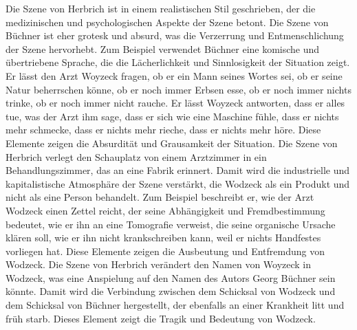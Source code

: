 \documentclass[a4paper,12pt]{report}
\begin{document}
Die Szene von Herbrich ist in einem realistischen Stil geschrieben, der die medizinischen und psychologischen Aspekte der Szene betont. Die Szene von Büchner ist eher grotesk und absurd, was die Verzerrung und Entmenschlichung der Szene hervorhebt. Zum Beispiel verwendet Büchner eine komische und übertriebene Sprache, die die Lächerlichkeit und Sinnlosigkeit der Situation zeigt. Er lässt den Arzt Woyzeck fragen, ob er ein Mann seines Wortes sei, ob er seine Natur beherrschen könne, ob er noch immer Erbsen esse, ob er noch immer nichts trinke, ob er noch immer nicht rauche. Er lässt Woyzeck antworten, dass er alles tue, was der Arzt ihm sage, dass er sich wie eine Maschine fühle, dass er nichts mehr schmecke, dass er nichts mehr rieche, dass er nichts mehr höre. Diese Elemente zeigen die Absurdität und Grausamkeit der Situation.
Die Szene von Herbrich verlegt den Schauplatz von einem Arztzimmer in ein Behandlungszimmer, das an eine Fabrik erinnert. Damit wird die industrielle und kapitalistische Atmosphäre der Szene verstärkt, die Wodzeck als ein Produkt und nicht als eine Person behandelt. Zum Beispiel beschreibt er, wie der Arzt Wodzeck einen Zettel reicht, der seine Abhängigkeit und Fremdbestimmung bedeutet, wie er ihn an eine Tomografie verweist, die seine organische Ursache klären soll, wie er ihn nicht krankschreiben kann, weil er nichts Handfestes vorliegen hat. Diese Elemente zeigen die Ausbeutung und Entfremdung von Wodzeck.
Die Szene von Herbrich verändert den Namen von Woyzeck in Wodzeck, was eine Anspielung auf den Namen des Autors Georg Büchner sein könnte. Damit wird die Verbindung zwischen dem Schicksal von Wodzeck und dem Schicksal von Büchner hergestellt, der ebenfalls an einer Krankheit litt und früh starb. Dieses Element zeigt die Tragik und Bedeutung von Wodzeck.
\end{document}
